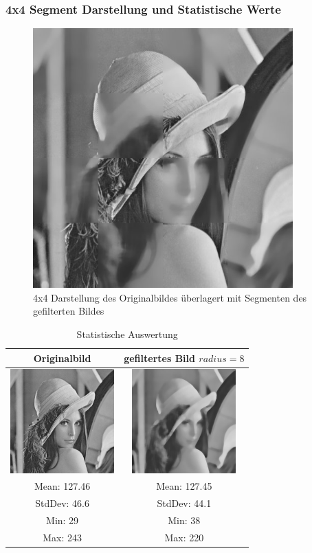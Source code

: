 \documentclass[12pt,german]{article}
\begin{document}
\subsubsection{4x4 Segment Darstellung und Statistische Werte}
\begin{figure}[H]
\centering
	\includegraphics[width=10cm]{../testData/Median/4x4LenaR8.jpg}
	\caption{4x4 Darstellung des Originalbildes überlagert mit Segmenten des gefilterten Bildes}
    \label{tab:checkerboard}
\end{figure}
\begin{table}[H]
  \centering
  \begin{tabular}{| c | c |}
    \hline
 	 Originalbild & gefiltertes Bild $radius = 8$ \\
    \hline
	\includegraphics[width=4cm]{../testData/Lena.jpg} & 	\includegraphics[width=4cm]{../testData/Median/LenaMedianR8.jpg} \\
	\hline
	Mean: 127.46 & Mean: 127.45 \\
	StdDev: 46.6 & StdDev: 44.1 \\
	Min: 29      & Min: 38      \\
	Max: 243     & Max: 220     \\
	\hline
  \end{tabular}
  \caption{Statistische Auswertung}
  \label{tab:Statistics}
\end{table}
\end{document}
